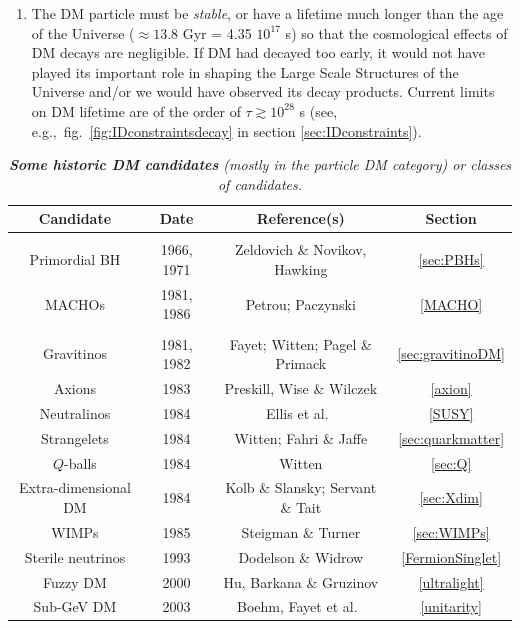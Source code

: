 \begin{enumerate}
\item The DM particle must be {\em stable}, or have a lifetime much longer than the age of the Universe ($\approx 13.8$ Gyr = 4.35  $10^{17}$ s) so that the cosmological effects of DM decays are negligible.
If DM had decayed too early, it would not have played its important role in shaping the Large Scale Structures of the Universe and/or we would have observed its decay products. Current limits on DM lifetime are of the order of $\tau \gtrsim 10^{28}$ s (see, e.g.,~fig.~\ref{fig:IDconstraintsdecay} in section \ref{sec:IDconstraints}).

\end{enumerate}

\renewcommand{\arraystretch}{0.7}
\begin{table}[!t]
\begin{center}
\small{
\begin{tabular}{c|c|c|c}
\bf Candidate & \bf Date & \bf Reference(s) & \bf  Section \\[1mm]
\hline 
 & & & \\[-1mm]
Primordial BH 		& 1966, 1971 & Zeldovich \& Novikov, Hawking \cite{PBH} & \ref{sec:PBHs} \\[1mm]
MACHOs	 		& 1981, 1986 & Petrou; Paczynski \cite{MACHO} & \ref{MACHO} \\[1mm]
\hdashline 
 & & & \\[-2mm]
Gravitinos			& 1981, 1982 & Fayet; Witten; Pagel \& Primack \cite{gravitinoDM} & \ref{sec:gravitinoDM} \\[1mm]
Axions 			& 1983 & Preskill, Wise \& Wilczek \cite{axionDM} & \ref{axion} \\[1mm]
Neutralinos 	& 1984 & Ellis et al.~\cite{SuSyDM} & \ref{SUSY} 
\\[1mm]
Strangelets		& 1984 &  Witten; Fahri \& Jaffe \cite{quark:matter:DM} & \ref{sec:quarkmatter} \\[1mm]
$Q$-balls			& 1984 &  Witten \cite{QballsBis} & \ref{sec:Q} \\[1mm]
Extra-dimensional DM & 1984 & Kolb \& Slansky; Servant \& Tait \cite{xdimDM} & \ref{sec:Xdim} \\[1mm]
WIMPs 			& 1985 & Steigman \& Turner \cite{WIMPs} & \ref{sec:WIMPs} \\[1mm]
Sterile neutrinos	& 1993 & Dodelson \& Widrow \cite{SterileNu} & \ref{FermionSinglet} \\[1mm]
Fuzzy DM 		& 2000 & Hu, Barkana \& Gruzinov \cite{FuzzyDM} & \ref{ultralight} \\[1mm]
Sub-GeV DM		& 2003 & Boehm, Fayet et al.~\cite{sub-GeVDM} & \ref{unitarity} \\[1mm] 
\end{tabular}}
\end{center}
\vspace{-5mm}
\caption[Historic particle DM candidates]{\em\label{tab:candidates} {\bfseries Some historic DM candidates} (mostly in the particle DM category) or classes of candidates.}
\end{table}
\renewcommand{\arraystretch}{1}

